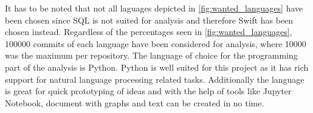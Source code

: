 \documentclass{article}
\begin{document}
  It has to be noted that not all laguages depicted in
  \autoref{fig:wanted_languages} have been chosen since SQL is not suited for
  analysis and therefore Swift has been chosen instead. Regardless of the
  percentages seen in \autoref{fig:wanted_languages}, 100000 commits of each
  language have been considered for analysis, where 10000 was the maximum per
  repository. The language of choice for the programming part of the analysis
  is Python. Python is well suited for this project as it has rich support for
  natural language processing related tasks. Additionally the language is great
  for quick prototyping of ideas and with the help of tools like Jupyter
  Notebook, document with graphs and text can be created in no time.
\end{document}
